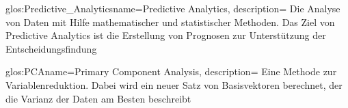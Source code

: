 


\newglossaryentry
{glos:Predictive_Analytics}{name=Predictive Analytics, description=
{Die Analyse von Daten mit Hilfe mathematischer und statistischer Methoden.
Das Ziel von Predictive Analytics ist die Erstellung von Prognosen zur
Unterstützung der Entscheidungsfindung}
}

\newglossaryentry
{glos:PCA}{name=Primary Component Analysis, description=
{Eine Methode zur Variablenreduktion. Dabei wird ein neuer Satz von
Basisvektoren berechnet, der die Varianz der Daten am Besten beschreibt}
}
